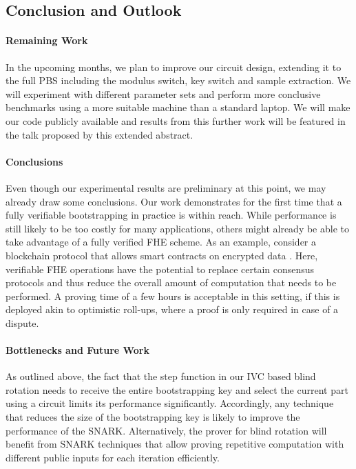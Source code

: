 \documentclass[9pt]{extarticle}
\begin{document}
\subsection{Conclusion and Outlook}
\label{sec:outlook}

\paragraph{Remaining Work}
In the upcoming months, we plan to improve our circuit design, extending it to the full PBS including the modulus switch, key switch and sample extraction. We will experiment with different parameter sets and perform more conclusive benchmarks using a more suitable machine than a standard laptop. We will make our code publicly available and results from this further work will be featured in the talk proposed by this extended abstract.

\paragraph{Conclusions}
Even though our experimental results are preliminary at this point, we may already draw some conclusions. Our work demonstrates for the first time that a fully verifiable bootstrapping in practice is within reach. While performance is still likely to be too costly for many applications, others might already be able to take advantage of a fully verified FHE scheme. As an example, consider a blockchain protocol that allows smart contracts on encrypted data \cite{fhevm,phenix}. Here, verifiable FHE operations have the potential to replace certain consensus protocols and thus reduce the overall amount of computation that needs to be performed. A proving time of a few hours is acceptable in this setting, if this is deployed akin to optimistic roll-ups, where a proof is only required in case of a dispute.

\paragraph{Bottlenecks and Future Work}
As outlined above, the fact that the step function in our IVC based blind rotation needs to receive the entire bootstrapping key and select the current part using a circuit limits its performance significantly. Accordingly, any technique that reduces the size of the bootstrapping key is likely to improve the performance of the SNARK. Alternatively, the prover for blind rotation will benefit from SNARK techniques that allow proving repetitive computation with different public inputs for each iteration efficiently.
\end{document}
